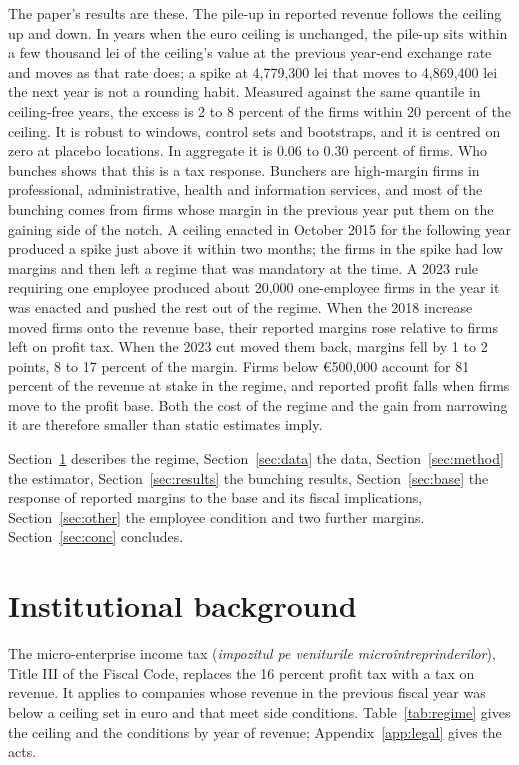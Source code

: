 \documentclass[12pt]{article}
\begin{document}
The paper's results are these. The pile-up in reported revenue follows the ceiling up and down. In years when the euro ceiling is unchanged, the pile-up sits within a few thousand lei of the ceiling's value at the previous year-end exchange rate and moves as that rate does; a spike at 4,779,300 lei that moves to 4,869,400 lei the next year is not a rounding habit. Measured against the same quantile in ceiling-free years, the excess is 2 to 8 percent of the firms within 20 percent of the ceiling. It is robust to windows, control sets and bootstraps, and it is centred on zero at placebo locations. In aggregate it is 0.06 to 0.30 percent of firms. Who bunches shows that this is a tax response. Bunchers are high-margin firms in professional, administrative, health and information services, and most of the bunching comes from firms whose margin in the previous year put them on the gaining side of the notch. A ceiling enacted in October 2015 for the following year produced a spike just above it within two months; the firms in the spike had low margins and then left a regime that was mandatory at the time. A 2023 rule requiring one employee produced about 20,000 one-employee firms in the year it was enacted and pushed the rest out of the regime. When the 2018 increase moved firms onto the revenue base, their reported margins rose relative to firms left on profit tax. When the 2023 cut moved them back, margins fell by 1 to 2 points, 8 to 17 percent of the margin. Firms below \euro{}500,000 account for 81 percent of the revenue at stake in the regime, and reported profit falls when firms move to the profit base. Both the cost of the regime and the gain from narrowing it are therefore smaller than static estimates imply.

Section~\ref{sec:inst} describes the regime, Section~\ref{sec:data} the data, Section~\ref{sec:method} the estimator, Section~\ref{sec:results} the bunching results, Section~\ref{sec:base} the response of reported margins to the base and its fiscal implications, Section~\ref{sec:other} the employee condition and two further margins. Section~\ref{sec:conc} concludes.

\FloatBarrier
\section{Institutional background}\label{sec:inst}

The micro-enterprise income tax (\emph{impozitul pe veniturile microîntreprinderilor}), Title III of the Fiscal Code, replaces the 16 percent profit tax with a tax on revenue. It applies to companies whose revenue in the previous fiscal year was below a ceiling set in euro and that meet side conditions. Table~\ref{tab:regime} gives the ceiling and the conditions by year of revenue; Appendix~\ref{app:legal} gives the acts.
\end{document}

